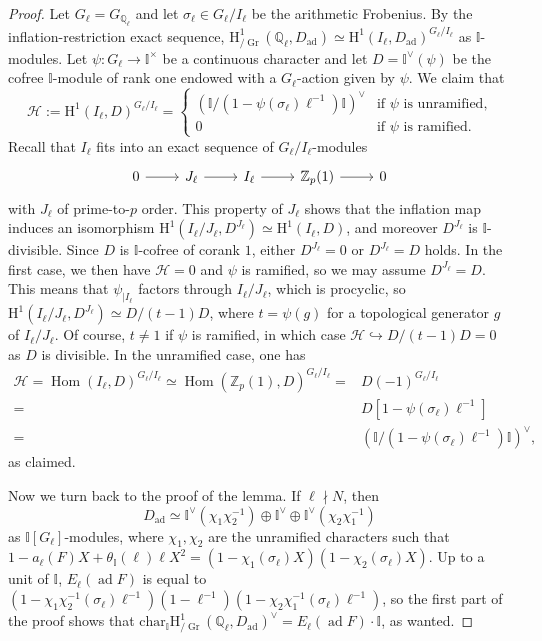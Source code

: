 \documentclass[12pt]{amsart}
\newcommand\bI{\mathbb{I}}
\newcommand\bQ{\mathbb{Q}}
\newcommand\Zp{{\mathbb{Z}_p}}
\newcommand\cH{\mathcal{H}}
\renewcommand{\char}{\textrm{char}}
\DeclareMathOperator{\Hom}{Hom}
\DeclareMathOperator{\ad}{ad}
\DeclareMathOperator{\Gr}{Gr}
\newcommand{\HH}{\mathrm{H}}
\theoremstyle{defstyle}
\theoremstyle{thmstyle}
\begin{document}
\begin{proof}
	Let $G_\ell=G_{\bQ_\ell}$ and let $\sigma_\ell\in G_\ell/I_\ell$ be the arithmetic Frobenius. By the inflation-restriction exact sequence, $\HH^1_{\slash\Gr}(\bQ_\ell,D_{\ad})\simeq \HH^1(I_\ell,D_{\ad})^{G_\ell/I_\ell}$ as $\bI$-modules. Let $\psi\colon G_\ell \to \bI^\times$ be a continuous character and let $D=\bI^\vee(\psi)$ be the cofree $\bI$-module of rank one endowed with a $G_\ell$-action given by $\psi$. We claim that 
	\[\cH:=\HH^1(I_\ell,D)^{G_\ell/I_\ell}=\left\{\begin{array}{ll}
		(\bI/(1-\psi(\sigma_\ell)\ell^{-1})\bI)^\vee & \mbox{if $\psi$ is unramified,} \\ 
		0 & \mbox{if $\psi$ is ramified.}
	\end{array}\right.\]
	Recall that $I_\ell$ fits into an exact sequence of $G_\ell/I_\ell$-modules
	\[\begin{tikzcd}
			0 \rar & J_\ell \rar & I_\ell \rar & \Zp(1) \rar & 0
	\end{tikzcd}\]
	with $J_\ell$ of prime-to-$p$ order. This property of $J_\ell$ shows that the inflation map induces an isomorphism $\HH^1(I_\ell/J_\ell,D^{J_\ell})\simeq \HH^1(I_\ell,D)$, and moreover $D^{J_\ell}$ is $\bI$-divisible. Since $D$ is $\bI$-cofree of corank $1$, either $D^{J_\ell}=0$ or $D^{J_\ell}=D$ holds. In the first case, we then have $\cH=0$ and $\psi$ is ramified, so we may assume $D^{J_\ell}=D$. This means that $\psi_{|I_\ell}$ factors through $I_\ell/J_\ell$, which is procyclic, so $\HH^1(I_\ell/J_\ell,D^{J_\ell})\simeq D/(t-1)D$, where $t=\psi(g)$ for a topological generator $g$ of $I_\ell/J_\ell$. Of course, $t\neq 1$ if $\psi$ is ramified, in which case $\cH\hookrightarrow D/(t-1)D=0$ as $D$ is divisible. In the unramified case, one has
	\small\begin{align*}\cH=\Hom(I_\ell,D)^{G_\ell/I_\ell}\simeq\Hom(\Zp(1),D)^{G_\ell/I_\ell}=&D(-1)^{G_\ell/I_\ell}\\ 
		=&D[1-\psi(\sigma_\ell)\ell^{-1}] \\ 
		=& (\bI/(1-\psi(\sigma_\ell)\ell^{-1})\bI)^\vee,
	\end{align*}\normalsize
	as claimed. 
	
	Now we turn back to the proof of the lemma. If $\ell\nmid N$, then 
	\begin{equation}\label{eq:proof_lemma_euler_factors}
		D_{\ad}\simeq \bI^\vee(\chi_1\chi_2^{-1})\oplus \bI^\vee \oplus \bI^\vee(\chi_2\chi_1^{-1})
	\end{equation}
	as $\bI[G_\ell]$-modules, where $\chi_1,\chi_2$ are the unramified characters such that $1-a_\ell(F)X+\theta_\bI(\ell)\ell X^2=(1-\chi_1(\sigma_\ell)X)(1-\chi_2(\sigma_\ell)X)$. Up to a unit of $\bI$, $E_\ell(\ad F)$ is equal to $(1-\chi_1\chi_2^{-1}(\sigma_\ell)\ell^{-1})(1-\ell^{-1})(1-\chi_2\chi_1^{-1}(\sigma_\ell)\ell^{-1})$, so the first part of the proof shows that $\char_{\bI} \HH^1_{\slash\Gr}(\bQ_\ell,D_{\ad})^\vee=E_\ell(\ad F)\cdot\bI$, as wanted.
	

\end{proof}
\end{document}
